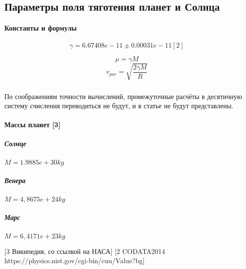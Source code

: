 \subsection{Параметры поля тяготения планет и Солнца}
\paragraph{Константы и формулы}
$$\gamma = 6.67408e-11 \pm 0.00031e-11 [2]$$

$$\mu = \gamma M$$
$$v_{par} = \sqrt{\frac{2\gamma M}{R}}$$
\subparagraph{}По соображениям точности вычислений, промежуточные расчёты в десятичную систему счисления переводиться не будут, и в статье не будут представлены.

\paragraph{Массы планет [3]}
\subparagraph{Солнце} $M = 1.9885e+30 kg$
\subparagraph{Венера} $M = 4,8675e+24 kg$
\subparagraph{Марс} $M = 6,4171e+23 kg$

[3 Википедия, со ссылкой на НАСА]
[2 CODATA2014 https://physics.nist.gov/cgi-bin/cuu/Value?bg]
